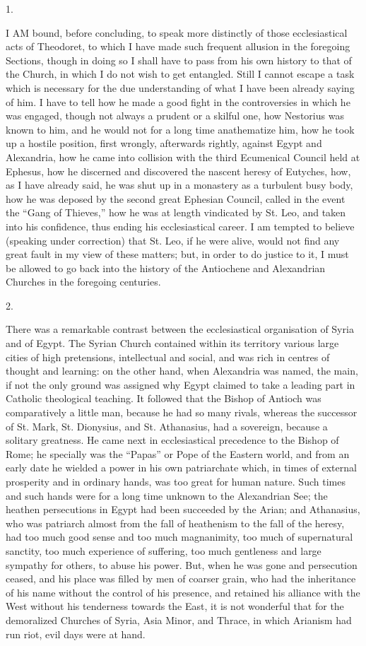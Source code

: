 1.

I AM bound, before concluding, to speak
more distinctly of those ecclesiastical acts of Theodoret, to which I
have made such frequent allusion in the foregoing Sections, though in
doing so I shall have to pass from his own history to that of the
Church, in which I do not wish to get entangled. Still I cannot escape
a task which is necessary for the due understanding of what I have
been already saying of him. I have to tell how he made a good fight in
the controversies in which he was engaged, though not always a prudent
or a skilful one, how Nestorius was known to him, and he would not for
a long time anathematize him, how he took up a hostile position, first
wrongly, afterwards rightly, against Egypt and Alexandria, how he came
into collision with the third Ecumenical Council held at Ephesus, how
he discerned and discovered the nascent heresy of Eutyches, how, as I
have already said, he was shut up in a monastery as a turbulent busy
body, how he was deposed by the second great Ephesian Council, called
in the event the ``Gang of Thieves,'' how he was at length
vindicated by St. Leo, and taken into his confidence, thus ending his
ecclesiastical career. I am tempted to believe (speaking under
correction) that St. Leo, if he were alive, would not find any great
fault in my view of these matters; but, in order to do justice to it,
I must be allowed to go back into the history of the Antiochene and
Alexandrian Churches in the foregoing centuries.

2.

There was a remarkable contrast between the ecclesiastical
organisation of Syria and of Egypt. The Syrian Church contained within
its territory various large cities of high pretensions, intellectual
and social, and was rich in centres of thought and learning: on the
other hand, when Alexandria was named, the main, if not the only
ground was assigned why Egypt claimed to take a leading part in
Catholic theological teaching. It followed that the Bishop of Antioch
was comparatively a little man, because he had so many rivals, whereas
the successor of St. Mark, St. Dionysius, and St. Athanasius, had a
sovereign, because a solitary greatness. He came next in
ecclesiastical precedence to the Bishop of Rome; he specially was the
``Papas'' or Pope of the Eastern world, and from an early date
he wielded a power in his own patriarchate which, in times of external
prosperity and in ordinary hands, was too great for human nature. Such
times and such hands were for a long time unknown to the Alexandrian
See; the heathen persecutions in Egypt had been succeeded by the
Arian; and Athanasius, who was patriarch almost from the fall of
heathenism to the fall of the heresy, had too much good sense and too
much magnanimity, too much of supernatural sanctity, too much
experience of suffering, too much gentleness and large sympathy for
others, to abuse his power. But, when he was gone and persecution
ceased, and his place was filled by men of coarser grain, who had the
inheritance of his name without the control of his presence, and
retained his alliance with the West without his tenderness towards the
East, it is not wonderful that for the demoralized Churches of Syria,
Asia Minor, and Thrace, in which Arianism had run riot, evil
days were at hand.


